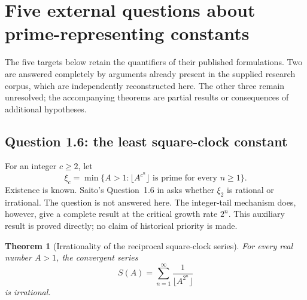 \documentclass[11pt,a4paper]{article}
\numberwithin{equation}{section}
\newtheorem{theorem}{Theorem}[section]
\theoremstyle{definition}
\theoremstyle{remark}
\begin{document}

\section{Five external questions about prime-representing constants}
\label{exm:section}

The five targets below retain the quantifiers of their published
formulations. Two are answered completely by arguments already present
in the supplied research corpus, which are independently reconstructed
here. The other three remain unresolved; the accompanying theorems are
partial results or consequences of additional hypotheses.

\subsection{Question 1.6: the least square-clock constant}
\label{exm:binary}

For an integer \(c\ge2\), let
\[
 \xi_c=\min\{A>1:\lfloor A^{c^n}\rfloor
                  \text{ is prime for every }n\ge1\}.
\]
Existence is known. Saito's Question~1.6 in
\cite{Saito2025} asks whether \(\xi_2\) is rational or irrational.
The question is not answered here. The integer-tail mechanism does,
however, give a complete result at the critical growth rate \(2^n\).
This auxiliary result is proved directly; no claim of historical
priority is made.

\begin{theorem}[Irrationality of the reciprocal square-clock series]
\label{exm:square-series}
For every real number \(A>1\), the convergent series
\[
 S(A)=\sum_{n=1}^{\infty}\frac1{\lfloor A^{2^n}\rfloor}
\]
is irrational.
\end{theorem}
\end{document}
